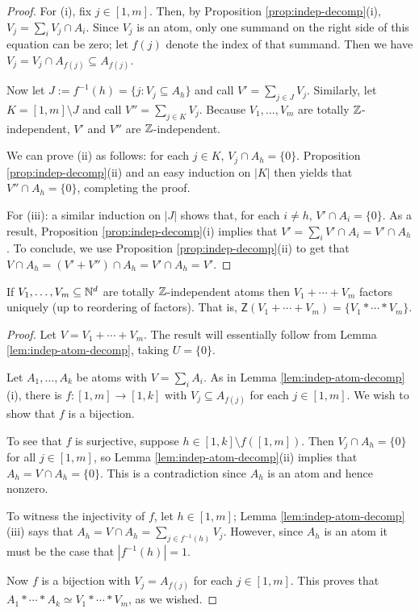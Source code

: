 \begin{proof}
	For (i), fix $j\in [ 1,m ]$.
	Then, by Proposition \ref{prop:indep-decomp}(i), $V_j = \sum_i V_j \cap A_i$.
	Since $V_j$ is an atom, only one summand on the right side of this equation can be zero; let $f(j)$ denote the index of that summand.
	Then we have $V_j = V_j \cap A_{f(j)} \subseteq A_{f(j)}$.
	
	Now let $J := f^{-1}(h) = \{j: V_j \subseteq A_h\}$ and call $V' = \sum_{j\in J} V_j$.
	Similarly, let $K = [ 1,m ] \setminus J$ and call $V'' = \sum_{j\in K} V_j$.
	Because $V_1,\dots, V_m$ are totally $\mathbb{Z}$-independent, $V'$ and $V''$ are $\mathbb{Z}$-independent.

	We can prove (ii) as follows: for each $j\in K$, $V_j\cap A_h = \{0\}$.
	Proposition \ref{prop:indep-decomp}(ii) and an easy induction on $|K|$ then yields that $V'' \cap A_h = \{0\}$, completing the proof.
	
	For (iii): a similar induction on $|J|$ shows that, for each $i\neq h$, $V' \cap A_i = \{0\}$.
	As a result, Proposition \ref{prop:indep-decomp}(i) implies that $V' = \sum_i V'\cap A_i = V'\cap A_h$.
	To conclude, we use Proposition \ref{prop:indep-decomp}(ii) to get that 
	$V\cap A_h = (V'+V'')\cap A_h = V'\cap A_h = V'$.
\end{proof}

\begin{thm} \label{thm:ind-atoms}
	If $V_1,\dots,V_m\subseteq \mathbb{N}^d$ are totally $\mathbb{Z}$-independent atoms then $V_1+\cdots+V_m$ factors uniquely (up to reordering of factors).
	That is, $\mathsf{Z}(V_1+\cdots+V_m) = \{ V_1*\cdots*V_m\}$.
\end{thm}

\begin{proof}
	Let $V = V_1+\cdots + V_m$.
	The result will essentially follow from Lemma \ref{lem:indep-atom-decomp}, taking $U = \{0\}$.
	
	Let $A_1,\dots, A_k$ be atoms with $V = \sum_i A_i$.
	As in Lemma \ref{lem:indep-atom-decomp}(i), there is $f:[ 1,m ] \to [ 1,k]$ with $V_j \subseteq A_{f(j)}$ for each $j\in [ 1,m]$.
	We wish to show that $f$ is a bijection. 
	
	To see that $f$ is surjective, suppose $h\in [1,k]\setminus f([1,m])$.
	Then $V_j \cap A_h = \{0\}$ for all $j\in [1,m]$, so Lemma \ref{lem:indep-atom-decomp}(ii) implies that $A_h = V\cap A_h  = \{0\}$.
	This is a contradiction since $A_h$ is an atom and hence nonzero.
	
	To witness the injectivity of $f$, let $h\in [1,m]$; Lemma \ref{lem:indep-atom-decomp}(iii) says that $A_h = V\cap A_h = \sum_{j\in f^{-1}(h)} V_j$.
	However, since $A_h$ is an atom it must be the case that $|f^{-1}(h)| =1$.
	
	Now $f$ is a bijection with $V_j = A_{f(j)}$ for each $j\in [1,m]$.
	This proves that $A_1*\cdots*A_k \simeq V_1*\cdots*V_m$, as we wished.
\end{proof}

